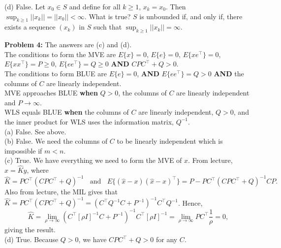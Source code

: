 \documentclass[letterpaper]{article}
\begin{document}
(d) False.  Let $x_0\in S$ and define for all $k\ge 1$, $x_k=x_0$. Then $\sup_{k \ge 1} ||x_k|| = ||x_0||< \infty.$ What is true? $S$ is unbounded if, and only if, there exists a sequence $(x_k)$ in $S$ such that $\sup_{k \ge 1} ||x_k|| = \infty.$\\



\vspace*{1cm}

\noindent \textbf{Problem 4:} The answers are (c) and (d). \\

The conditions to form the MVE are $E\{x\}=0$, $E\{e\}=0$, $E\{xe^\top\}=0$,  $E\{x x^\top\}=P \ge 0$, $E\{e e^\top\}=Q\ge0$ \textbf{AND} $CPC^\top + Q >0$. \\

The conditions to form BLUE are $E\{e\}=0$, \textbf{AND} $E\{e e^\top\}=Q >0$ \textbf{AND} the columns of $C$ are linearly independent.\\

MVE approaches BLUE \textbf{when} $Q>0$, the columns of $C$ are linearly independent and $P \to \infty$.\\

WLS equals BLUE \textbf{when} the columns of $C$ are linearly independent, $Q>0$, and the inner product for WLS uses the information matrix, $Q^{-1}$.\\

(a) False. See above.\\

(b) False. We need the columns of $C$ to be linearly independent which is impossible if $m<n$. \\

(c) True.  We have everything we need to form the MVE of $x$. From lecture, $ \hat{x}= \widehat{K} y$, where $$\widehat{K}=PC^\top ( C P C^\top + Q)^{-1} ~~~~\text{and}~~~~
E\{ (\hat{x}-x)(\hat{x}-x)^\top \}=P - PC^\top(CPC^\top + Q)^{-1}CP.$$
Also from lecture, the MIL gives that  $\widehat{K}=P C^\top(C PC^\top +Q)^{-1}  = (C^\top Q^{-1}C + P^{-1})^{-1} C^\top Q^{-1}$. Hence,
$$ \widehat{K} = \lim_{\rho \to \infty}  (C^\top [\rho I]^{-1}C + P^{-1})^{-1} C^\top [\rho I]^{-1}=\lim_{\rho \to \infty}  P C^\top \frac{1}{\rho}=0, $$
giving the result. \\

(d) True. Because $Q>0$, we have  $CPC^\top + Q >0$ for any $C$.\\

\newpage
\end{document}
